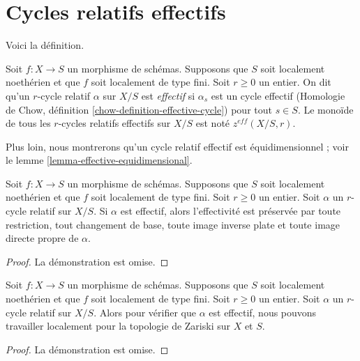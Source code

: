 \section{Cycles relatifs effectifs} 
\label{section-effective} 


\noindent
 Voici la définition. 

\begin{definition} 
\label{definition-effective} 
Soit  $f : X \to S$  un morphisme de schémas. Supposons que  $S$  soit localement noethérien et
 que  $f$  soit localement de type fini. Soit $r \geq 0$  un entier. On dit 
qu'un  $r$-cycle relatif  $\alpha$  sur $X/S$  est {\it effectif} si  $\alpha_s$ est un
 cycle effectif 
(Homologie de Chow, définition \ref{chow-definition-effective-cycle}) 
pour tout $s \in S$. Le monoïde de tous les  $r$-cycles relatifs effectifs
 sur $X/S$  est noté  $z^{eff}(X/S, r)$. 
\end{definition} 

\noindent
 Plus loin, nous montrerons qu'un cycle relatif effectif est équidimensionnel ; 
voir le lemme \ref{lemma-effective-equidimensional}. 

\begin{lemma} 
\label{lemma-effective-functoriality} 
Soit  $f : X \to S$  un morphisme de schémas. Supposons que  $S$  soit localement noethérien et
 que  $f$  soit localement de type fini. Soit $r \geq 0$  un entier. Soit  
$\alpha$  un  $r$-cycle relatif sur $X/S$. Si  $\alpha$  est effectif, alors 
l'effectivité est préservée par toute restriction, tout changement de base, toute image inverse plate et toute image directe propre
 de  $\alpha$. 
\end{lemma} 

\begin{proof} La 
démonstration est omise. 
\end{proof} 

\begin{lemma} 
\label{lemma-check-effective} 
Soit  $f : X \to S$  un morphisme de schémas. Supposons que  $S$  soit localement noethérien et
 que  $f$  soit localement de type fini. Soit $r \geq 0$  un entier. Soit  $\alpha$
  un  $r$-cycle relatif sur $X/S$. Alors pour vérifier que  $\alpha$  est effectif, nous pouvons
 travailler localement pour la topologie de Zariski sur  $X$  et $S$. 
\end{lemma} 

\begin{proof} La 
démonstration est omise. 
\end{proof} 

